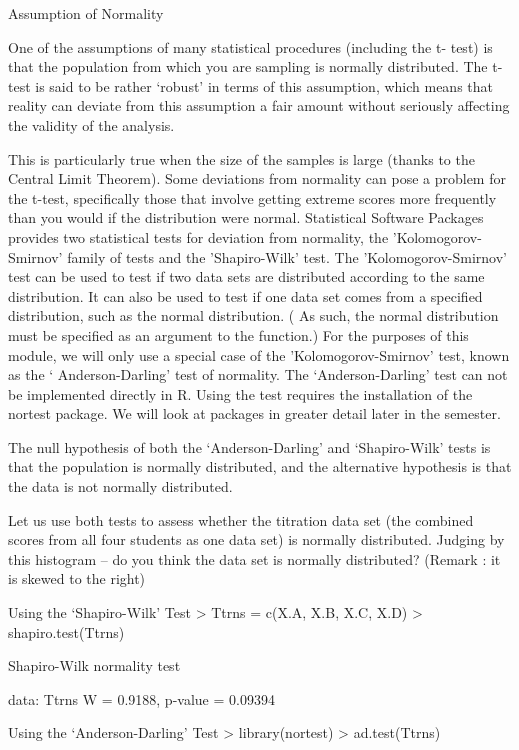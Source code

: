 Assumption of Normality

One of the assumptions of many statistical procedures (including the t- test) is that the population from which you are sampling is normally distributed. The t-test is said to be rather ‘robust’ in terms of this assumption, which means that reality can deviate from this assumption a fair amount without seriously affecting the validity of the analysis. 

This is particularly true when the size of the samples is large (thanks to the Central Limit Theorem). Some deviations from normality can pose a problem for the t-test, specifically those that involve getting extreme scores more frequently than you would if the distribution were normal. 
Statistical Software Packages provides two statistical tests for deviation from normality, the 'Kolomogorov-Smirnov' family of tests and the 'Shapiro-Wilk' test. 
The 'Kolomogorov-Smirnov' test can be used to test if two data sets are distributed according to the same distribution. It can also be used to test if one data set comes from a specified distribution, such as the normal distribution. ( As such, the normal distribution must be specified as an argument to the function.)
For the purposes of this module, we will only use a special case of the 'Kolomogorov-Smirnov' test, known as the ‘ Anderson-Darling' test of normality.
The ‘Anderson-Darling’ test can not be implemented directly in R. Using the test requires the installation of the nortest package. We will look at packages in greater detail later in the semester.

The null hypothesis of both the `Anderson-Darling’ and `Shapiro-Wilk’ tests is that the population is normally distributed, and the alternative hypothesis is that the data is not normally distributed. 




Let us use both tests to assess whether the titration data set (the combined scores from all four students as one data set) is normally distributed.
Judging by this histogram – do you think the data set is normally distributed? 
(Remark : it is skewed to the right)
 
 

Using the ‘Shapiro-Wilk’ Test
> Ttrns = c(X.A, X.B, X.C, X.D)
> shapiro.test(Ttrns)

        Shapiro-Wilk normality test

data:  Ttrns 
W = 0.9188, p-value = 0.09394

Using the ‘Anderson-Darling’ Test
> library(nortest)
> ad.test(Ttrns)

